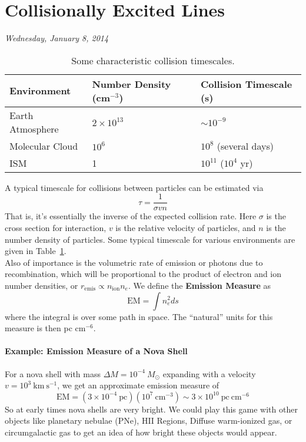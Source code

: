 \documentclass[10pt]{article}
\numberwithin{equation}{section}
\newcommand{\n}{\noindent}
\begin{document}
\section{Collisionally Excited Lines} %
\label{sec:collisionally_excited_lines}
\n\textit{Wednesday, January 8, 2014}\\

\begin{table}
  \centering
  \begin{tabular}{l l l}
  Environment & Number Density (cm$^{-3}$) & Collision Timescale (s)\\
  \hline
  Earth Atmosphere & $2\times 10^{13}$ & $\sim 10^{-9}$\\
  Molecular Cloud & $10^6$ & $10^8$ (several days)\\
  ISM & 1 & $10^{11}$ ($10^4$ yr)
  \end{tabular}
  \caption{Some characteristic collision timescales.}
  \label{tab:2.1}
\end{table}
A typical timescale for collisions between particles can be estimated via
\begin{equation}
  \label{eq:coll:1} \tau = \frac{1}{\sigma v n}
\end{equation}
That is, it's essentially the inverse of the expected collision rate. Here
$\sigma$ is the cross section for interaction, $v$ is the relative velocity of
particles, and $n$ is the number density of particles. Some typical timescale
for various environments are given in Table~\ref{tab:2.1}.\\

\n Also of importance is the volumetric rate of emission or photons due to
recombination, which will be proportional to the product of electron and ion
number densities, or $r_{\mathrm{emis}}\propto n_{\mathrm{ion}}n_e$. We define
the \textbf{Emission Measure} as
\begin{equation}
  \label{eq:coll:2} \mathrm{EM} = \int n_e^2 ds
\end{equation}
where the integral is over some path in space. The ``natural'' units for this
measure is then pc cm$^{-6}$.
\paragraph{Example: Emission Measure of a Nova Shell} %
\label{par:example_emission_measure_of_a_nova_shell}
  For a nova shell with mass $\Delta M = 10^{-4}\ M_\odot$ expanding with a
  velocity $v=10^3\ \mathrm{km\ s^{-1}}$, we get an approximate emission
  measure of
  \begin{equation}
    \mathrm{EM} = (3\times 10^{-4}\ \mathrm{pc})(10^7\ \mathrm{cm^{-3}}) \sim
    3\times 10^{10}\ \mathrm{pc\ cm^{-6}}
  \end{equation}
  So at early times nova shells are very bright. We could play this game with
  other objects like planetary nebulae (PNe), HII Regions, Diffuse warm-ionized
  gas, or circumgalactic gas to get an idea of how bright these objects would
  appear.
\end{document}
